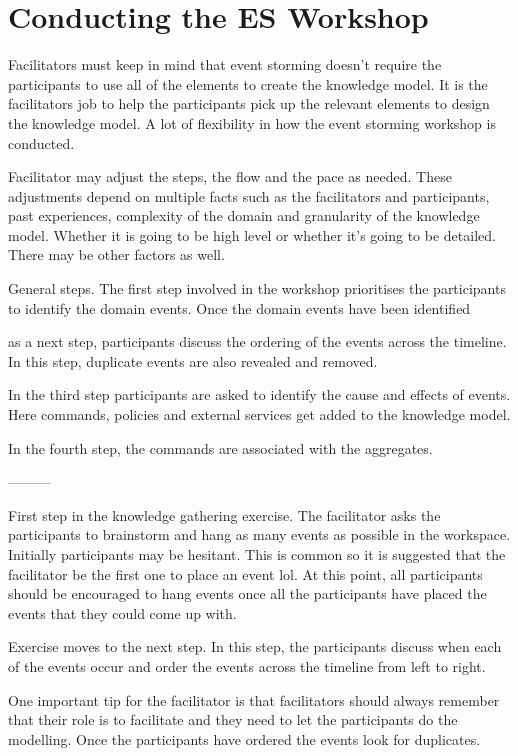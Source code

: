 \documentclass[a4paper, 11pt]{book}
\begin{document}
    \section{Conducting the ES Workshop}

    Facilitators must keep in mind that event storming doesn't require the participants to use all of the elements to create the knowledge model.
    It is the facilitators job to help the participants pick up the relevant elements to design the knowledge model.
    A lot of flexibility in how the event storming workshop is conducted.

    Facilitator may adjust the steps, the flow and the pace as needed.
    These adjustments depend on multiple facts such as the facilitators and participants, past experiences, complexity of the domain and granularity of the knowledge model.
    Whether it is going to be high level or whether it's going to be detailed.
    There may be other factors as well.

    General steps.
    The first step involved in the workshop prioritises the participants to identify the domain events.
    Once the domain events have been identified

    as a next step, participants discuss the ordering of the events across the timeline.
    In this step, duplicate events are also revealed and removed.

    In the third step participants are asked to identify the cause and effects of events.
    Here commands, policies and external services get added to the knowledge model.

    In the fourth step, the commands are associated with the aggregates.

    ---------

    First step in the knowledge gathering exercise.
    The facilitator asks the participants to brainstorm and hang as many events as possible in the workspace.
    Initially participants may be hesitant.
    This is common so it is suggested that the facilitator be the first one to place an event lol.
    At this point, all participants should be encouraged to hang events once all the participants have placed the events that they could come up with.

    Exercise moves to the next step.
    In this step, the participants discuss when each of the events occur and order the events across the timeline from left to right.

    One important tip for the facilitator is that facilitators should always remember that their role is to facilitate and they need to let the participants do the modelling.
    Once the participants have ordered the events look for duplicates.
\end{document}
